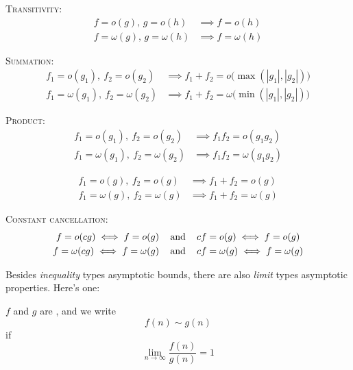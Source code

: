\begin{prop}
  \mbox{}
  \begin{myenum}
    \item
    \textsc{Transitivity:}
    \begin{align*}
      f = o(g) \text{, } g = o(h) &\implies f = o(h) \\
      f = \omega(g) \text{, } g = \omega(h) &\implies f = \omega(h)
    \end{align*}
  \item
    \textsc{Summation:}
    \begin{align*}
      f_1 = o(g_1), \ f_2 = o(g_2) &\implies f_1 + f_2 = o \bigl( \max(|g_1|,|g_2|) \bigr) \\
      f_1 = \omega(g_1), \ f_2 = \omega(g_2) &\implies f_1 + f_2 = \omega \bigl( \min(|g_1|,|g_2|) \bigr)
    \end{align*}
  \item
    \textsc{Product:}
    \begin{align*}
      f_1 = o(g_1), \ f_2 = o(g_2) &\implies f_1 f_2 = o(g_1 g_2) \\
      f_1 = \omega(g_1), \ f_2 = \omega(g_2) &\implies f_1 f_2 = \omega(g_1 g_2) 
    \end{align*}
  \end{myenum}
\end{prop}

\begin{cor}
    \begin{align*}
    f_1 = o(g), \ f_2 = o(g) &\implies f_1 + f_2 = o(g) \\
    f_1 = \omega(g), \ f_2 = \omega(g) &\implies f_1 + f_2 = \omega(g)
    \end{align*}
\end{cor}

\begin{cor}
    \textsc{Constant cancellation:}
    \begin{align*}
      f = o(cg) \iff f = o(g)           &\text{ \,\,\, and \,\,\, } cf = o(g) \iff f = o(g) \\
      f = \omega(cg) \iff f = \omega(g) &\text{ \,\,\, and \,\,\, } cf = \omega(g) \iff f = \omega(g)
    \end{align*}
\end{cor}


Besides \textit{inequality} types asymptotic bounds, there are also
\textit{limit} types asymptotic properties.
Here's one:

\begin{defn}
  $f$ and $g$ are ,
  and we write
  \[
  f(n) \sim g(n)
  \]
  if
  \[
  \lim_{n \rightarrow \infty} \frac{f(n)}{g(n)} = 1
  \]
\end{defn}

